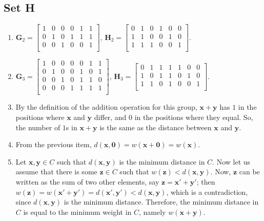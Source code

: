 \documentclass{article}
\begin{document}
\subsection{Set H}
\begin{enumerate}
    \item $\mathbf{G}_2 = \begin{bmatrix}
        1 & 0 & 0 & 0 & 1 & 1 \\
        0 & 1 & 0 & 1 & 1 & 1 \\
        0 & 0 & 1 & 0 & 0 & 1 \\
    \end{bmatrix}$, 
    $\mathbf{H}_2 = \begin{bmatrix}
        0 & 1 & 0 & 1 & 0 & 0 \\
        1 & 1 & 0 & 0 & 1 & 0 \\
        1 & 1 & 1 & 0 & 0 & 1 \\
    \end{bmatrix}$.

    \item $\mathbf{G}_3 = \begin{bmatrix}
        1 & 0 & 0 & 0 & 0 & 1 & 1\\
        0 & 1 & 0 & 0 & 1 & 0 & 1 \\
        0 & 0 & 1 & 0 & 1 & 1 & 0 \\
        0 & 0 & 0 & 1 & 1 & 1 & 1 \\
    \end{bmatrix}$,
    $\mathbf{H}_3 = \begin{bmatrix}
        0 & 1 & 1 & 1 & 1 & 0 & 0 \\
        1 & 0 & 1 & 1 & 0 & 1 & 0\\
        1 & 1 & 0 & 1 & 0 & 0 & 1 \\
    \end{bmatrix}$.

    \item By the definition of the addition operation for this group, $\mathbf{x} + \mathbf{y}$ has $1$ in the positions where $\mathbf{x}$ and $\mathbf{y}$ differ, and $0$ in the positions where they equal. So, the number of $1$s in $\mathbf{x} + \mathbf{y}$ is the same as the distance between $\mathbf{x}$ and $\mathbf{y}$.

    \item From the previous item, $d(\mathbf{x}, \mathbf{0}) = w(\mathbf{x} + \mathbf{0}) = w(\mathbf{x})$.

    \item Let $\mathbf{x}, \mathbf{y} \in C$ such that $d(\mathbf{x}, \mathbf{y})$ is the minimum distance in $C$. Now let us assume that there is some $\mathbf{z} \in C$ such that $w(\mathbf{z}) < d(\mathbf{x}, \mathbf{y})$. Now, $\mathbf{z}$ can be written as the sum of two other elements, say $\mathbf{z} = \mathbf{x'} + \mathbf{y'}$; then $w(\mathbf{z}) = w(\mathbf{x'} + \mathbf{y'}) = d(\mathbf{x'}, \mathbf{y'}) < d(\mathbf{x}, \mathbf{y})$, which is a contradiction, since $d(\mathbf{x}, \mathbf{y})$ is the minimum distance. Therefore, the minimum distance in $C$ is equal to the minimum weight in $C$, namely $w(\mathbf{x} + \mathbf{y})$.


\end{enumerate}
\end{document}
